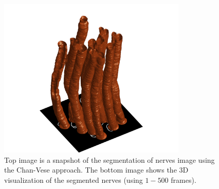 \documentclass[a4paper]{article}
\begin{document}
\begin{enumerate}
\begin{figure}[!b]
	\includegraphics[width=0.8\textwidth]{./figures/final_res3.png}
    \caption{Top image is a snapshot of the segmentation of nerves image using the Chan-Vese approach. The bottom image shows the 3D visualization of the segmented nerves (using $1-500$ frames).}
	\label{final3}
\end{figure}		


\end{enumerate}
\end{document}
